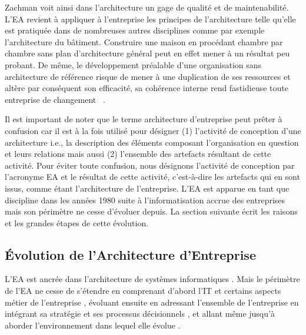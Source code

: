 Zachman voit ainsi dans l'architecture un gage de qualité et de maintenabilité. 
L'EA revient à appliquer à l'entreprise les principes de l'architecture telle 
qu'elle est pratiquée dans de nombreuses autres disciplines comme par exemple 
l'architecture du bâtiment. Construire une maison en procédant chambre par 
chambre sans plan d'architecture général peut en effet mener à un résultat peu 
probant. De même, le développement préalable d'une organisation sans 
architecture de référence risque de mener à une duplication de ses ressources et 
altère par conséquent son efficacité, sa cohérence interne rend fastidieuse 
toute entreprise de changement~\cite{zachman1997enterprise} 
\cite{bernard2012introduction}. 

Il est important de noter que le terme architecture d'entreprise peut prêter à 
confusion car il est à la fois utilisé pour désigner (1) l'activité de 
conception d'une architecture i.e., la description des éléments composant 
l'organisation en question et leurs relations mais aussi (2) l'ensemble des 
artefacts résultant de cette activité. Pour éviter toute confusion, nous 
désignons l'activité de conception par l'acronyme EA et le résultat de cette 
activité, c'est-à-dire les artefacts qui en sont issus, comme étant 
l'architecture de l'entreprise. L'EA est apparue en tant que discipline dans 
les années 1980 suite à l'informatisation accrue des entreprises mais son 
périmètre ne cesse d'évoluer depuis. La section suivante écrit les raisons et 
les grandes étapes de cette évolution. 


\subsection{Évolution de l'Architecture d'Entreprise}

L'EA est ancrée dans l'architecture de systèmes informatiques
\cite{kappelman2008enterprise}. Mais le périmètre de l'EA ne cesse de s'étendre
en comprenant d'abord l'IT et certains aspects métier de l'entreprise
\cite{winter2006essential}, évoluant ensuite en adressant l'ensemble de
l'entreprise en intégrant sa stratégie et ses processus décisionnels
\cite{ross2006enterprise}, et allant même jusqu'à aborder l'environnement dans
lequel elle évolue \cite{lapalme2012three}.

